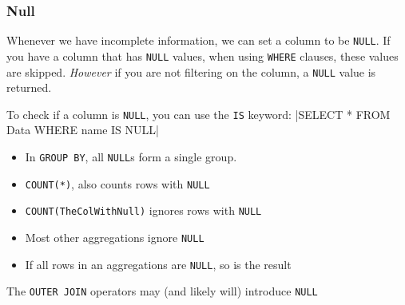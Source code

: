 \newpage
\subsubsection{Null}
\label{sec:sql-null}
Whenever we have incomplete information, we can set a column to be \texttt{NULL}.
If you have a column that has \texttt{NULL} values, when using \texttt{WHERE} clauses, these values are skipped.
\textit{However} if you are not filtering on the column, a \texttt{NULL} value is returned.

To check if a column is \texttt{NULL}, you can use the \texttt{IS} keyword:
|SELECT * FROM Data WHERE name IS NULL|

\begin{itemize}[itemsep=-3pt]
    \item In \texttt{GROUP BY}, all \texttt{NULL}s form a single group.
    \item \texttt{COUNT(*)}, also counts rows with \texttt{NULL}
    \item \texttt{COUNT(TheColWithNull)} ignores rows with \texttt{NULL}
    \item Most other aggregations ignore \texttt{NULL}
    \item If all rows in an aggregations are \texttt{NULL}, so is the result
\end{itemize}

The \texttt{OUTER JOIN} operators may (and likely will) introduce \texttt{NULL}

